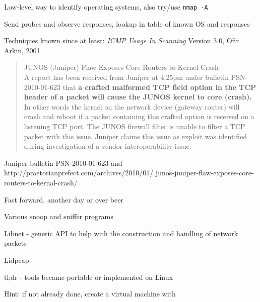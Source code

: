 \documentclass[Screen16to9,17pt]{foils}
\begin{document}
\begin{list2}
\item Low-level way to identify operating systems, also try/use
  \verb+nmap -A+
\item Send probes and observe responses, lookup in table of known OS and responses
\item Techniques known since at least: \emph{ICMP Usage In Scanning} Version 3.0,
  Ofir Arkin, 2001 %
\end{list2}



\begin{quote}
	JUNOS (Juniper) Flaw Exposes Core Routers to Kernel Crash\\
A report has been received from Juniper at 4:25pm under bulletin PSN-2010-01-623 that {\bf a crafted malformed TCP field option in the TCP header of a packet will cause the JUNOS kernel to core (crash).} In other words the kernel on the network device (gateway router) will crash and reboot if a packet containing this crafted option is received on a listening TCP port. The JUNOS firewall filter is unable to filter a TCP packet with this issue. Juniper claims this issue as exploit was identified during investigation of a vendor interoperability issue.
\end{quote}

Juniper bulletin PSN-2010-01-623 and \\
{\footnotesize http://praetorianprefect.com/archives/2010/01/
junos-juniper-flaw-exposes-core-routers-to-kernal-crash/}




\begin{list1}
\item Fast forward, another day or over beer
\item Various snoop and sniffer programs
\item Libnet - generic API to help with the construction and handling of network packets
\item Lidpcap
\end{list1}

\centerline{tl;dr - tools became portable or implemented on Linux}

\vskip 3cm
Hint: if not already done, create a virtual machine with\\
\end{document}
